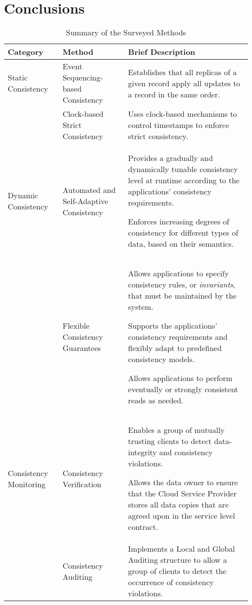 \documentclass{sig-alternate-10pt}
\begin{document}
\section{Conclusions}
\label{sec:conclusions}
\begin{table*}[t]
	\setlength\extrarowheight{4pt}
	\centering
	\caption{Summary of the Surveyed Methods}
    \vspace{1mm}
	\label{tab:surveyedMethods}
	\begin{tabular}{>{\raggedright\arraybackslash}p{4cm}>{\raggedright\arraybackslash}p{4.5cm}>{\raggedright\arraybackslash}p{7.5cm}}
		\hline
		Category   & Method    & Brief Description       \\ \hline
		Static Consistency & Event Sequencing-based Consistency \cite{cooper2008pnuts} & Establishes that all replicas of a given record apply all updates to a record in the same order.     \\                                                   
		& Clock-based Strict Consistency \cite{Corbett:2013, Du2013} & Uses clock-based mechanisms to control timestamps to enforce strict consistency. \\ \hline
		
		Dynamic Consistency                                                                     & Automated and Self-Adapt\-ive Con\-sist\-en\-cy \cite{chihoub2012harmony, esteves2012quality, Terry:2013} & Provides a gradually and dynamically tunable consistency level at runtime according to the applications' consistency requirements. \par Enforces increasing degrees of consistency for different types of data, based on their semantics.\\
		& Flexible Consistency Guarantees \cite{balegas2015putting, Chen:2014, sivasubramanian2012amazon} & Allows applications to specify consistency rules, or \textit{invariants}, that must be maintained by the system. \par Supports the applications' consistency requirements and flexibly adapt to predefined consistency models. \par Allows applications to perform eventually or strongly consistent reads as needed.  \\ \hline
		
		Consistency Monitoring  & Consistency Verification \cite{BrandenburgerCK15, MukundanML12} & Enables a group of mutually trusting clients to detect data-integrity and consistency violations.  \par Allows the data owner to ensure that the Cloud Service Provider stores all data copies that are agreed upon in the service level contract.  \\
		& Consistency Auditing \cite{liu2014consistency} & Implements a Local and Global Auditing structure to allow a group of clients to detect the occurrence of consistency violations.    \\
		\hline
	\end{tabular}
\end{table*}
\end{document}
